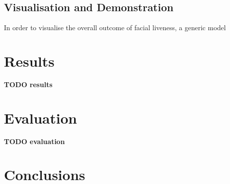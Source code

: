\documentclass[10pt,a4paper]{article}
\begin{document}
    \subsection{Visualisation and Demonstration}
        In order to visualise the overall outcome of facial liveness, a generic model 
\section{Results}
    \textbf{TODO results}
\section{Evaluation}
    \textbf{TODO evaluation}


\section{Conclusions}




\end{document}
